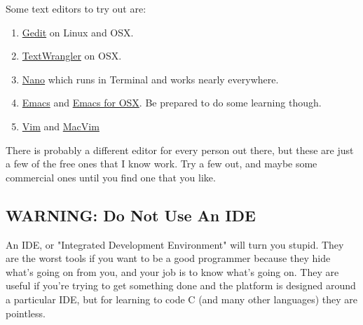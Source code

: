 Some text editors to try out are:

\begin{enumerate}
\item \href{http://projects.gnome.org/gedit/}{Gedit} on Linux and OSX.
\item \href{http://www.barebones.com/products/textwrangler/}{TextWrangler} on OSX.
\item \href{http://www.nano-editor.org/}{Nano} which runs in Terminal and works nearly everywhere.
\item \href{http://www.gnu.org/software/emacs/}{Emacs} and \href{http://emacsformacosx.com/}{Emacs for OSX}.  Be prepared to do some learning though.
\item \href{http://www.vim.org/}{Vim} and \href{http://code.google.com/p/macvim/}{MacVim}
\end{enumerate}

There is probably a different editor for every person out there, but these are
just a few of the free ones that I know work.  Try a few out, and maybe some
commercial ones until you find one that you like.

\subsection{WARNING: Do Not Use An IDE}

An IDE, or "Integrated Development Environment" will turn you stupid.  They are
the worst tools if you want to be a good programmer because they hide what's
going on from you, and your job is to know what's going on.  They are useful
if you're trying to get something done and the platform is designed around 
a particular IDE, but for learning to code C (and many other languages) they
are pointless.

